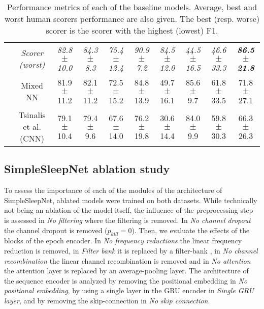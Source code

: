 \documentclass[journal]{IEEEtran}
\begin{document}
\begin{table*}[ht]
{\begin{tabular}{|c|c |c c c|c c c c c|}
  & \textcolor{NavyBlue}{\textit{Scorer (worst)}}  & \textcolor{NavyBlue}{\textit{82.8  $\pm$  10.0}} & \textcolor{NavyBlue}{\textit{84.3  $\pm$   8.3}} & \textcolor{NavyBlue}{\textit{75.4  $\pm$  12.4}} &\textcolor{NavyBlue}{\textit{90.9  $\pm$  7.2}}&\textcolor{NavyBlue}{\textit{84.5  $\pm$  12.0}} &\textcolor{NavyBlue}{\textit{44.5  $\pm$  16.5}} &\textcolor{NavyBlue}{\textit{46.6  $\pm$  33.3}}&\textcolor{NavyBlue}{\textit{\textbf{86.5  $\pm$  21.8}}}\\
  
   & Mixed NN \cite{Dong2018}  & 81.9  $\pm$  11.2 & 82.1  $\pm$  11.2 & 72.5  $\pm$  15.2 &84.8  $\pm$  13.9 &49.7  $\pm$  16.1&85.6  $\pm$  9.7  &61.8  $\pm$  33.5  &71.8  $\pm$  27.1 \\

 & Tsinalis et al. (CNN) \cite{Tsinalis2016a}& 79.1  $\pm$  10.4  & 79.4  $\pm$  9.6   & 67.6  $\pm$  14.0 &76.2  $\pm$  19.8 &30.6  $\pm$  14.4 &84.0  $\pm$  9.9 &59.8  $\pm$  30.3 &66.3  $\pm$  26.3 \\ 
 \hline
\end{tabular}
}
\caption{Performance metrics of each of the baseline models. Average, best and worst human scorers performance are also given. The best (resp. worse) scorer is the scorer with the highest (lowest) F1.}
\label{tab:complete_results}
\vspace{-1.6em}
\end{table*}
 

\subsection{SimpleSleepNet ablation study}
To assess the importance of each of the modules of the architecture of SimpleSleepNet, ablated models were trained on both datasets.
While technically not being an ablation of the model itself, the influence of the preprocessing step is assessed in \textit{No filtering} where the filtering is removed. In \textit{No channel dropout} the channel dropout is removed ($p_{kill} = 0$). Then, we evaluate the effects of the blocks of the epoch encoder. In \textit{No frequency reductions} the linear frequency reduction is removed, in \textit{Filter bank} it is replaced by a filter-bank \cite{Phan2019}, in \textit{No channel recombination} the linear channel recombination is removed and in \textit{No attention} the attention layer is replaced by an average-pooling layer. The architecture of the sequence encoder is analyzed by removing the positional embedding in \textit{No positional embedding}, by using a single layer in the GRU encoder in \textit{Single GRU layer}, and by removing the skip-connection in \textit{No skip connection}. 
\end{document}
